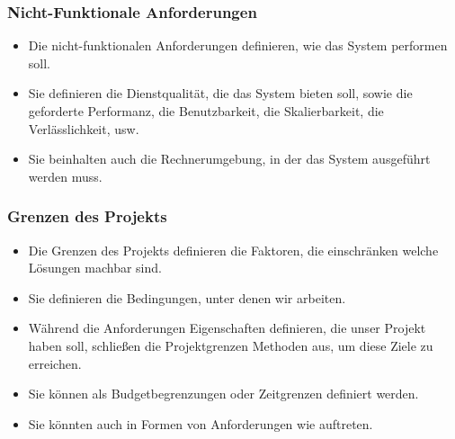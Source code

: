\documentclass[aspectratio=169,mathserif,notheorems]{beamer}%
\begin{document}
%
\begin{frame}%
\frametitle{Nicht-Funktionale Anforderungen}%
%
\begin{itemize}%
\item Die nicht-funktionalen Anforderungen definieren, wie das System performen soll.%
\item<2-> Sie definieren die Dienstqualität, die das System bieten soll, sowie die geforderte Performanz, die Benutzbarkeit, die Skalierbarkeit, die Verlässlichkeit, usw.%
\item<3-> Sie beinhalten auch die Rechnerumgebung, in der das System ausgeführt werden muss.%
\end{itemize}%
\end{frame}%
%
\begin{frame}%
\frametitle{Grenzen des Projekts}%
%
\begin{itemize}%
\item Die Grenzen des Projekts definieren die Faktoren, die einschränken welche Lösungen machbar sind.%
%
\item<2-> Sie definieren die Bedingungen, unter denen wir arbeiten.%
%
\item<3-> Während die Anforderungen Eigenschaften definieren, die unser Projekt haben soll, \alert{schließen} die Projektgrenzen Methoden \alert{aus}, um diese Ziele zu erreichen.%
%
\item<4-> Sie können als Budgetbegrenzungen oder Zeitgrenzen definiert werden.%
%
\item<5-> Sie könnten auch in Formen von Anforderungen wie \emph{} auftreten.%
\end{itemize}%
\end{frame}%
%
\end{document}
